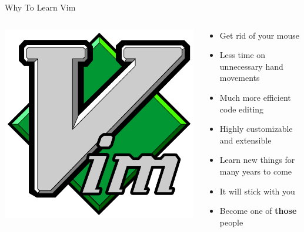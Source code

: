 \documentclass{beamer}
\begin{document}
\usebackgroundtemplate{}
\begin{frame}{Why To Learn Vim}
    \begin{columns}
        \begin{column}{0.4\textwidth}
            \begin{center}
                \includegraphics[width=1\textwidth]{images/vim-logo.png}
            \end{center}
        \end{column}
        \begin{column}{0.6\textwidth}
            \begin{itemize}
                \item Get rid of your mouse
                \item Less time on unnecessary hand movements
                \item Much more efficient code editing
                \item Highly customizable and extensible
                \item Learn new things for many years to come
                \item It will stick with you
                \item Become one of \textbf{those} people
            \end{itemize}
        \end{column}
    \end{columns}
\end{frame}
\end{document}
